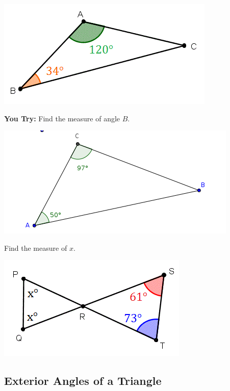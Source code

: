 \documentclass[12pt]{article}
\begin{document}
\begin{center}
\includegraphics[scale=.5]{triangle3.png}
\end{center}

\hrulefill

\textbf{You Try:} Find the measure of angle $B$.\\

\begin{center}
\includegraphics[scale=.5]{triangle4.png}\\
\end{center}

Find the measure of $x$.\\

\begin{center}
\includegraphics[scale=.5]{triangle5.png}
\end{center}

\subsection*{Exterior Angles of a Triangle}
\end{document}
